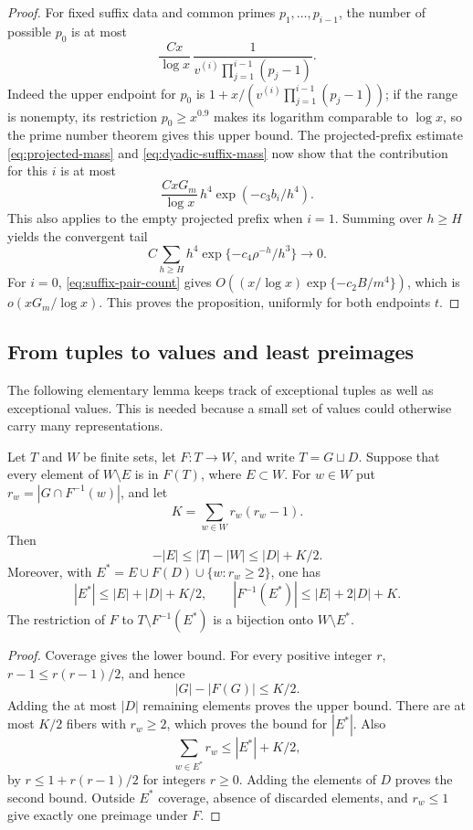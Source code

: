 \begin{proof}
For fixed suffix data and common primes $p_1,\ldots,p_{i-1}$, the
number of possible $p_0$ is at most
\[
 \frac{Cx}{\log x}\,
 \frac1{v^{(i)}\prod_{j=1}^{i-1}(p_j-1)}.
\]
Indeed the upper endpoint for $p_0$ is
$1+x/(v^{(i)}\prod_{j=1}^{i-1}(p_j-1))$; if the range is nonempty,
its restriction $p_0\ge x^{0.9}$ makes its logarithm comparable to
$\log x$, so the prime number theorem gives this upper bound.
The projected-prefix estimate \eqref{eq:projected-mass} and
\eqref{eq:dyadic-suffix-mass} now show that the contribution for this
$i$ is at most
\[
 \frac{CxG_m}{\log x}\,h^4\exp(-c_3b_i/h^4).
\]
This also applies to the empty projected prefix when $i=1$.
Summing over $h\ge H$ yields the convergent tail
\[
 C\sum_{h\ge H}h^4\exp\{-c_4\rho^{-h}/h^3\}\longrightarrow0.
\]
For $i=0$, \eqref{eq:suffix-pair-count} gives
$O((x/\log x)\exp\{-c_2B/m^4\})$, which is
$o(xG_m/\log x)$.  This proves the proposition, uniformly for both
endpoints $t$.
\end{proof}

\subsection{From tuples to values and least preimages}

The following elementary lemma keeps track of exceptional tuples as
well as exceptional values.  This is needed because a small set of
values could otherwise carry many representations.

\begin{lemma}\label{lem:finite-map}
Let $T$ and $W$ be finite sets, let $F:T\to W$, and write
$T=G\sqcup D$.  Suppose that every element of $W\setminus E$ is
in $F(T)$, where $E\subset W$.  For $w\in W$ put
$r_w=|G\cap F^{-1}(w)|$, and let
\[
 K=\sum_{w\in W}r_w(r_w-1).
\]
Then
\[
 -|E|\le |T|-|W|\le |D|+K/2.
\]
Moreover, with
$E^*=E\cup F(D)\cup\{w:r_w\ge2\}$, one has
\[
 |E^*|\le|E|+|D|+K/2,\qquad
 |F^{-1}(E^*)|\le|E|+2|D|+K.
\]
The restriction of $F$ to $T\setminus F^{-1}(E^*)$ is a bijection
onto $W\setminus E^*$.
\end{lemma}

\begin{proof}
Coverage gives the lower bound.  For every positive integer $r$,
$r-1\le r(r-1)/2$, and hence
\[
 |G|-|F(G)|\le K/2.
\]
Adding the at most $|D|$ remaining elements proves the upper bound.
There are at most $K/2$ fibers with $r_w\ge2$, which proves the
bound for $|E^*|$.  Also
\[
 \sum_{w\in E^*}r_w\le|E^*|+K/2,
\]
by $r\le1+r(r-1)/2$ for integers $r\ge0$.  Adding the elements of
$D$ proves the second bound.  Outside $E^*$ coverage, absence of
discarded elements, and $r_w\le1$ give exactly one preimage under $F$.
\end{proof}

